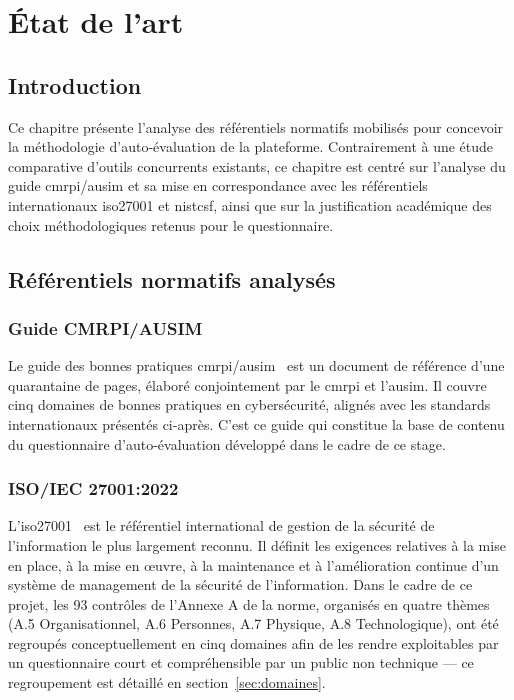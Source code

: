 \chapter{État de l'art}
\label{chap:etat_art}

\section*{Introduction}

Ce chapitre présente l'analyse des référentiels normatifs mobilisés pour concevoir la méthodologie d'auto-évaluation de la plateforme. Contrairement à une étude comparative d'outils concurrents existants, ce chapitre est centré sur l'analyse du guide \gls{cmrpi}/\gls{ausim} et sa mise en correspondance avec les référentiels internationaux \gls{iso27001} et \gls{nistcsf}, ainsi que sur la justification académique des choix méthodologiques retenus pour le questionnaire.

\section{Référentiels normatifs analysés}
\label{sec:referentiels}

\subsection{Guide CMRPI/AUSIM}

\hspace{1cm}Le guide des bonnes pratiques \gls{cmrpi}/\gls{ausim}~\cite{cmrpiausim} est un document de référence d'une quarantaine de pages, élaboré conjointement par le \gls{cmrpi} et l'\gls{ausim}. Il couvre cinq domaines de bonnes pratiques en cybersécurité, alignés avec les standards internationaux présentés ci-après. C'est ce guide qui constitue la base de contenu du questionnaire d'auto-évaluation développé dans le cadre de ce stage.

\subsection{ISO/IEC 27001:2022}

L'\gls{iso27001}~\cite{iso27001} est le référentiel international de gestion de la sécurité de l'information le plus largement reconnu. Il définit les exigences relatives à la mise en place, à la mise en \oe{}uvre, à la maintenance et à l'amélioration continue d'un système de management de la sécurité de l'information. Dans le cadre de ce projet, les 93 contrôles de l'Annexe A de la norme, organisés en quatre thèmes (A.5 Organisationnel, A.6 Personnes, A.7 Physique, A.8 Technologique), ont été regroupés conceptuellement en cinq domaines afin de les rendre exploitables par un questionnaire court et compréhensible par un public non technique --- ce regroupement est détaillé en section~\ref{sec:domaines}.

